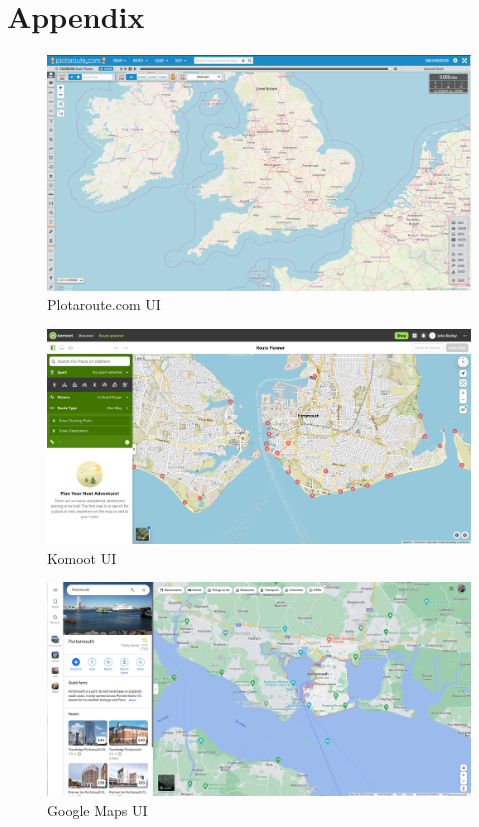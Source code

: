 \chapter{Appendix}
\begin{figure}[!ht]
    \centering
    \includegraphics[width=1\linewidth]{figures/plotarouteui.png}
    \caption{Plotaroute.com UI}
    \label{fig:plotarouteui}
\end{figure}

\begin{figure}[!ht]
    \centering
    \includegraphics[width=1\linewidth]{figures/komootui.png}
    \caption{Komoot UI}
    \label{fig:komootui}
\end{figure}

\begin{figure}[!ht]
    \centering
    \includegraphics[width=1\linewidth]{figures/gmapsui.png}
    \caption{Google Maps UI}
    \label{fig:gmapsui}
\end{figure}